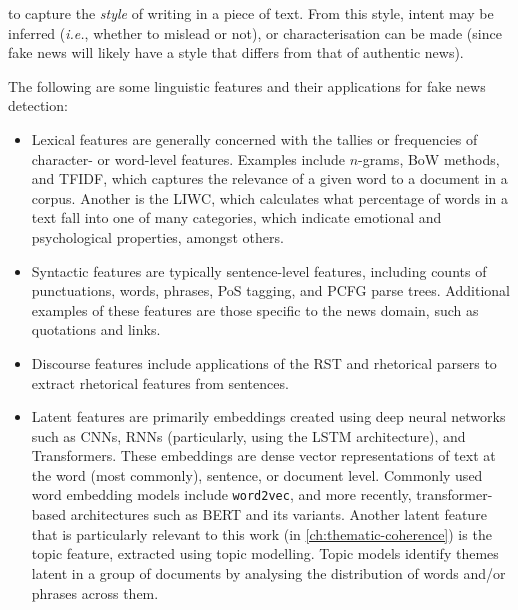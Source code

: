 to capture the \emph{style} of writing in a piece of text. From this style, intent may be inferred (\emph{i.e.}, whether to mislead or not), or characterisation can be made (since fake news will likely have a style that differs from that of authentic news).

The following are some linguistic features and their applications for fake news detection:

\begin{itemize}
    \item Lexical features are generally concerned with the tallies or frequencies of character- or word-level features. Examples include $n$-grams, \ac{BoW} methods, and \ac{TFIDF}, which captures the relevance of a given word to a document in a corpus. Another is the \ac{LIWC}, which calculates what percentage of words in a text fall into one of many categories, which indicate emotional and psychological properties, amongst others.

    \item Syntactic features are typically sentence-level features, including counts of punctuations, words, phrases, \ac{PoS} tagging, and \ac{PCFG} parse trees. Additional examples of these features are those specific to the news domain, such as quotations and links.

    \item Discourse features include applications of the \ac{RST} and rhetorical parsers to extract rhetorical features from sentences.

    \item Latent features are primarily embeddings created using deep neural networks such as \acp{CNN}, \acp{RNN} (particularly, using the \ac{LSTM} architecture), and Transformers. These embeddings are dense vector representations of text at the word (most commonly), sentence, or document level. Commonly used word embedding models include \texttt{word2vec}, and more recently, transformer-based architectures such as BERT and its variants. Another latent feature that is particularly relevant to this work (in \autoref{ch:thematic-coherence}) is the topic feature, extracted using topic modelling. Topic models identify themes latent in a group of documents by analysing the distribution of words and/or phrases across them.
\end{itemize}


